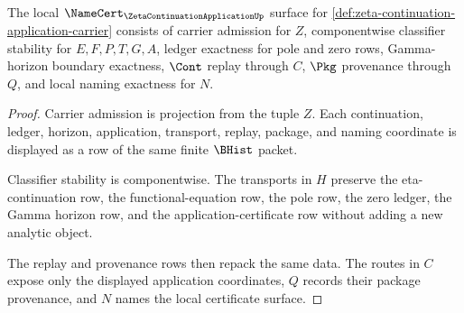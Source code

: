 \begin{theorem}
\label{thm:zeta-continuation-application-namecert-obligations}
The local $\NameCert_{\ZetaContinuationApplicationUp}$ surface for \autoref{def:zeta-continuation-application-carrier} consists of carrier admission for $Z$, componentwise classifier stability for $E,F,P,T,G,A$, ledger exactness for pole and zero rows, Gamma-horizon boundary exactness, $\Cont$ replay through $C$, $\Pkg$ provenance through $Q$, and local naming exactness for $N$.
\end{theorem}
\begin{proof}
Carrier admission is projection from the tuple $Z$. Each continuation, ledger, horizon, application, transport, replay, package, and naming coordinate is displayed as a row of the same finite $\BHist$ packet.

Classifier stability is componentwise. The transports in $H$ preserve the eta-continuation row, the functional-equation row, the pole row, the zero ledger, the Gamma horizon row, and the application-certificate row without adding a new analytic object.

The replay and provenance rows then repack the same data. The routes in $C$ expose only the displayed application coordinates, $Q$ records their package provenance, and $N$ names the local certificate surface.
\end{proof}

